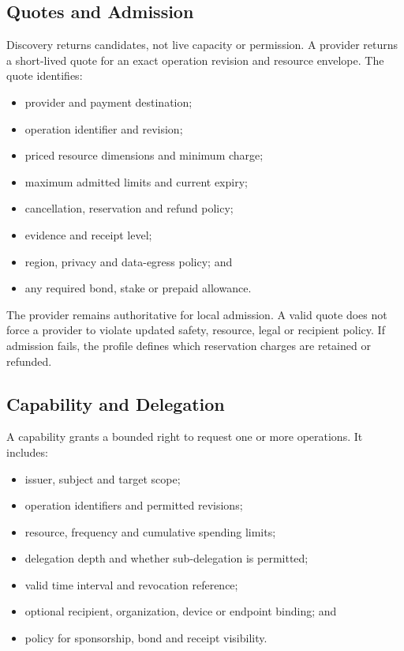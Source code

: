 \documentclass[11pt,oneside]{article}
\begin{document}
\subsection{Quotes and Admission}

Discovery returns candidates, not live capacity or permission. A provider returns a
short-lived quote for an exact operation revision and resource envelope. The quote identifies:

\begin{itemize}
  \item provider and payment destination;
  \item operation identifier and revision;
  \item priced resource dimensions and minimum charge;
  \item maximum admitted limits and current expiry;
  \item cancellation, reservation and refund policy;
  \item evidence and receipt level;
  \item region, privacy and data-egress policy; and
  \item any required bond, stake or prepaid allowance.
\end{itemize}

The provider remains authoritative for local admission. A valid quote does not force a
provider to violate updated safety, resource, legal or recipient policy. If admission fails,
the profile defines which reservation charges are retained or refunded.

\subsection{Capability and Delegation}

A capability grants a bounded right to request one or more operations. It includes:

\begin{itemize}
  \item issuer, subject and target scope;
  \item operation identifiers and permitted revisions;
  \item resource, frequency and cumulative spending limits;
  \item delegation depth and whether sub-delegation is permitted;
  \item valid time interval and revocation reference;
  \item optional recipient, organization, device or endpoint binding; and
  \item policy for sponsorship, bond and receipt visibility.
\end{itemize}
\end{document}
